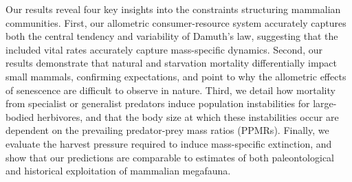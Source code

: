\documentclass[]{rsos}%
\begin{document}
Our results reveal four key insights into the constraints structuring mammalian communities.
First, our allometric consumer-resource system accurately captures both the central tendency and variability of Damuth's law, suggesting that the included vital rates accurately capture mass-specific dynamics.
Second, our results demonstrate that natural and starvation mortality differentially impact small mammals, confirming expectations, and point to why the allometric effects of senescence are difficult to observe in nature.
Third, we detail how mortality from specialist or generalist predators induce population instabilities for large-bodied herbivores, and that the body size at which these instabilities occur are dependent on the prevailing predator-prey mass ratios (PPMRs).
Finally, we evaluate the harvest pressure required to induce mass-specific extinction, and show that our predictions are comparable to estimates of both paleontological and historical exploitation of mammalian megafauna.







\end{document}
